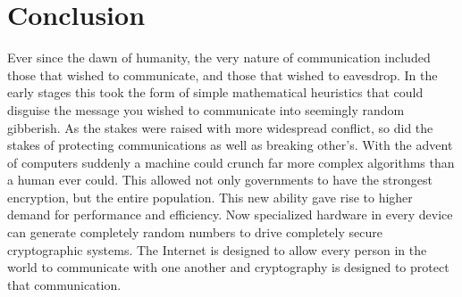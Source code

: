 \documentclass[journal]{IEEEtran}
\begin{document}
%






\section{Conclusion}
Ever since the dawn of humanity, the very nature of communication included those that wished to communicate, and those that wished to eavesdrop.  In the early stages this took the form of simple mathematical heuristics that could disguise the message you wished to communicate into seemingly random gibberish.  As the stakes were raised with more widespread conflict, so did the stakes of protecting communications as well as breaking other's.  With the advent of computers suddenly a machine could crunch far more complex algorithms than a human ever could.  This allowed not only governments to have the strongest encryption, but the entire population.  This new ability gave rise to higher demand for performance and efficiency.  Now specialized hardware in every device can generate completely random numbers to drive completely secure cryptographic systems.  The Internet is designed to allow every person in the world to communicate with one another and cryptography is designed to protect that communication.
\end{document}
